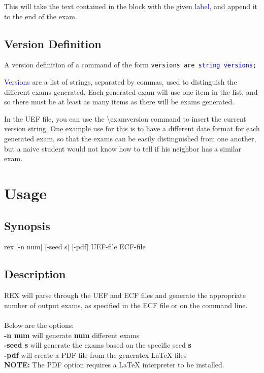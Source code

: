 \documentclass{article}
\begin{document}
This will take the text contained in the block with the given \textcolor{blue}{label}, and append it to the end of the exam.

\subsection{Version Definition}
A version definition of a command of the form \texttt{versions are \textcolor{blue}{string versions};}

\textcolor{blue}{Versions} are a list of strings, separated by commas, used to distinguish the different exams generated. Each generated exam will use one item in the list, and so there must be at least as many items as there will be exams generated. 

In the UEF file, you can use the \textbackslash{examversion} command to insert the current version string. One example use for this is to have a different date format for each generated exam, so that the exams can be easily distinguished from one another, but a naive student would not know how to tell if his neighbor has a similar exam.

\section{Usage}

\subsection{Synopsis}
rex [-n num] [-seed s] [-pdf] UEF-file ECF-file

\subsection{Description}
REX will parse through the UEF and ECF files and generate the appropriate number
of output exams, as specified in the ECF file or on the command line.
\\
\\
\noindent Below are the options:\\
\indent \textbf{-n num} will generate \textbf{num} different exams\\
\indent \textbf{-seed s} will generate the exams based on the specific seed \textbf{s}\\
\indent \textbf{-pdf} will create a PDF file from the generatex \LaTeX{} files\\

\noindent \textbf{NOTE:} The PDF option requires a \LaTeX{} interpreter to be installed.
\end{document}
